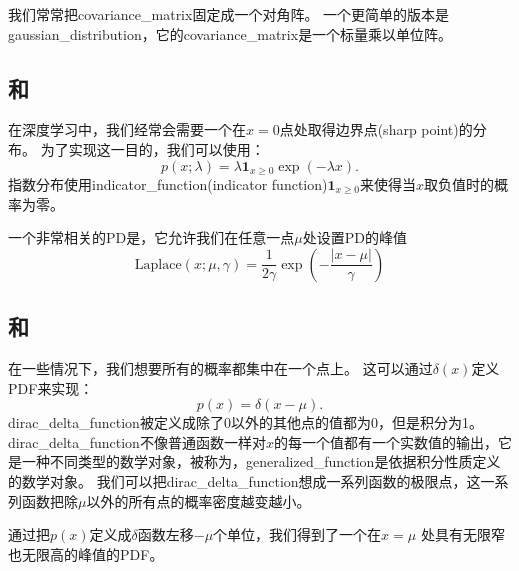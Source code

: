 
我们常常把\gls{covariance_matrix}固定成一个对角阵。
一个更简单的版本是\gls{gaussian_distribution}，它的\gls{covariance_matrix}是一个标量乘以单位阵。

\subsection{和}
\label{sec:exponential_and_laplace_distributions}

在深度学习中，我们经常会需要一个在$x=0$点处取得边界点(sharp point)的分布。
为了实现这一目的，我们可以使用：
\begin{equation}
p(x; \lambda) = \lambda \bm{1}_{x\ge 0} \exp(-\lambda x).
\end{equation}
指数分布使用\gls{indicator_function}(indicator function)$\bm{1}_{x\ge 0}$来使得当$x$取负值时的概率为零。

一个非常相关的\gls{PD}是，它允许我们在任意一点$\mu$处设置\gls{PD}的峰值
\begin{equation}
\text{Laplace}(x; \mu, \gamma) = \frac{1}{2\gamma} \exp \left( -\frac{|x-\mu|}{\gamma}  \right)
\end{equation}

\subsection{和}
\label{sec:the_dirac_distribution_and_empirical_distribution}

在一些情况下，我们想要所有的概率都集中在一个点上。
这可以通过$\delta(x)$定义\gls{PDF}来实现：
\begin{equation}
p(x) = \delta(x-\mu).
\end{equation}
\gls{dirac_delta_function}被定义成除了0以外的其他点的值都为0，但是积分为1。
\gls{dirac_delta_function}不像普通函数一样对$x$的每一个值都有一个实数值的输出，它是一种不同类型的数学对象，被称为，\gls{generalized_function}是依据积分性质定义的数学对象。
我们可以把\gls{dirac_delta_function}想成一系列函数的极限点，这一系列函数把除$\mu$以外的所有点的概率密度越变越小。


通过把$p(x)$定义成$\delta$函数左移$-\mu$个单位，我们得到了一个在$x=\mu$ 处具有无限窄也无限高的峰值的\gls{PDF}。

